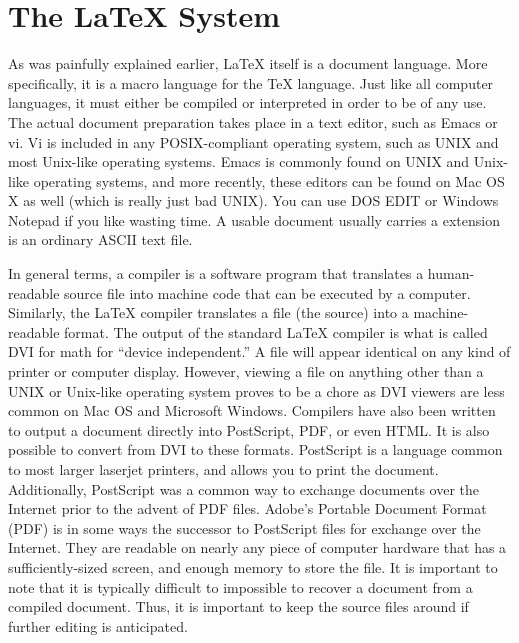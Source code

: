 \section{The \LaTeX{} System}
\label{sec:latex-system}

As was painfully explained earlier, \LaTeX{} itself is a document
language.  More specifically, it is a macro language for the \TeX{}
language.  Just like all computer languages, it must either be
compiled or interpreted in order to be of any use.  The actual
document preparation takes place in a text editor, such as Emacs or
vi.  Vi is included in any POSIX-compliant operating system, such as
UNIX and most Unix-like operating systems.  Emacs is commonly found on
UNIX and Unix-like operating systems, and more recently, these editors
can be found on Mac OS X as well (which is really just bad UNIX).  You
can use DOS EDIT or Windows Notepad if you like wasting time.  A
usable document usually carries a \texext{} extension is an ordinary
ASCII text file.

In general terms, a compiler is a software program that translates a
human-readable source file into machine code that can be executed by a
computer.  Similarly, the \LaTeX{} compiler translates a \texext{}
file (the source) into a machine-readable format.  The output of the
standard \LaTeX{} compiler is what is called DVI for math for ``device
independent.''  A \dviext{} file will appear identical on any kind of
printer or computer display.  However, viewing a \dviext{} file on
anything other than a UNIX or Unix-like operating system proves to be
a chore as DVI viewers are less common on Mac OS and Microsoft
Windows.  Compilers have also been written to output a \texext{}
document directly into PostScript, PDF, or even HTML\@.  It is also
possible to convert from DVI to these formats.  PostScript is a
language common to most larger laserjet printers, and allows you to
print the document.  Additionally, PostScript was a common way to
exchange documents over the Internet prior to the advent of PDF files.
Adobe's Portable Document Format (PDF) is in some ways the successor
to PostScript files for exchange over the Internet.  They are readable
on nearly any piece of computer hardware that has a sufficiently-sized
screen, and enough memory to store the file.  It is important to note
that it is typically difficult to impossible to recover a \texext{}
document from a compiled document.  Thus, it is important to keep the
source files around if further editing is anticipated.

